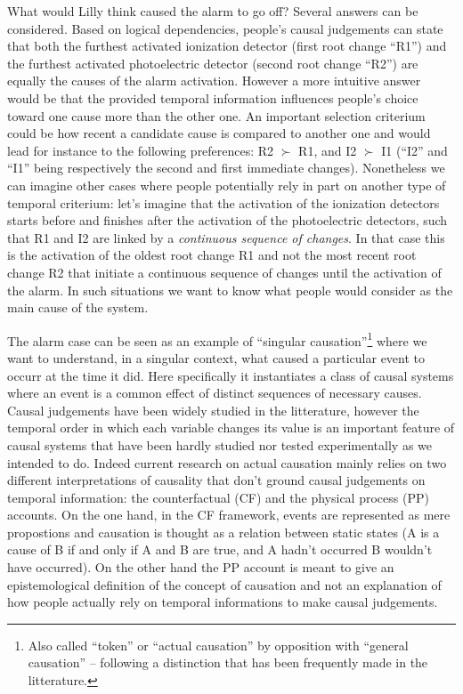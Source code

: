 \documentclass[10pt,letterpaper]{article}
\begin{document}
What would Lilly think caused the alarm to go off? Several answers can be considered. Based on logical dependencies, people's causal judgements can state that both the furthest activated ionization detector (first root change ``R1'') and the furthest activated photoelectric detector (second root change ``R2'') are equally the causes of the alarm activation. However a more intuitive answer would be that the provided temporal information influences people's choice toward one cause more than the other one. An important selection criterium could be how recent a candidate cause is compared to another one and would lead for instance to the following preferences: R2 $\succ$ R1, and I2 $\succ$ I1 (``I2'' and ``I1'' being respectively the second and first immediate changes). Nonetheless we can imagine other cases where people potentially rely in part on another type of temporal criterium: let's imagine that the activation of the ionization detectors starts before and finishes after the activation of the photoelectric detectors, such that R1 and I2 are linked by a \textit{continuous sequence of changes}. In that case this is the activation of the oldest root change R1 and not the most recent root change R2 that initiate a continuous sequence of changes until the activation of the alarm. In such situations we want to know what people would consider as the main cause of the system.

The alarm case can be seen as an example of ``singular causation''\footnote{Also called ``token'' or ``actual causation'' by opposition with ``general causation'' -- following a distinction that has been frequently made in the litterature.} where we want to understand, in a singular context, what caused a particular event to occurr at the time it did. Here specifically it instantiates a class of causal systems where an event is a common effect of distinct sequences of necessary causes. Causal judgements have been widely studied in the litterature, however the temporal order in which each variable changes its value is an important feature of causal systems that have been hardly studied nor tested experimentally as we intended to do. Indeed current research on actual causation mainly relies on two different interpretations of causality that don't ground causal judgements on temporal information: the counterfactual (CF) and the physical process (PP) accounts. On the one hand, in the CF framework, events are represented as mere propostions and causation is thought as a relation between static states (A is a cause of B if and only if A and B are true, and A hadn't occurred B wouldn't have occurred). On the other hand the PP account is meant to give an epistemological definition of the concept of causation and not an explanation of how people actually rely on temporal informations to make causal judgements.
\end{document}

